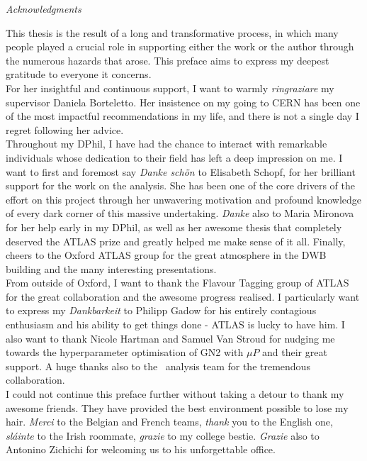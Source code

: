 \clearpage
{
\vspace{-1cm}
\begin{center}
\textit{\large \color{oxfordblue} Acknowledgments}
\end{center}}
This thesis is the result of a long and transformative process, in which many people played a crucial role in supporting either the work or the author through the numerous hazards that arose. This preface aims to express my deepest gratitude to everyone it concerns. \\

For her insightful and continuous support, I want to warmly \textit{ringraziare} my supervisor Daniela Borteletto. Her insistence on my going to CERN has been one of the most impactful recommendations in my life, and there is not a single day I regret following her advice.\\

Throughout my DPhil, I have had the chance to interact with remarkable individuals whose dedication to their field has left a deep impression on me. I want to first and foremost say \textit{Danke schön} to Elisabeth Schopf, for her brilliant support for the work on the analysis. She has been one of the core drivers of the effort on this project through her unwavering motivation and profound knowledge of every dark corner of this massive undertaking. \textit{Danke} also to Maria Mironova for her help early in my DPhil, as well as her awesome thesis that completely deserved the ATLAS prize and greatly helped me make sense of it all. Finally, cheers to the Oxford ATLAS group for the great atmosphere in the DWB building and the many interesting presentations. \\

From outside of Oxford, I want to thank the Flavour Tagging group of ATLAS for the great collaboration and the awesome progress realised. I particularly want to express my \textit{Dankbarkeit} to Philipp Gadow for his entirely contagious enthusiasm and his ability to get things done - ATLAS is lucky to have him. I also want to thank Nicole Hartman and Samuel Van Stroud for nudging me towards the hyperparameter optimisation of GN2 with $\mu$$P$ and their great support. A huge thanks also to the \vhbc\ analysis team for the tremendous collaboration. \\

I could not continue this preface further without taking a detour to thank my awesome friends. They have provided the best environment possible to lose my hair. \textit{Merci} to the Belgian and French teams, \textit{thank} you to the English one, \textit{sláinte} to the Irish roommate, \textit{grazie} to my college bestie. \textit{Grazie} also to Antonino Zichichi for welcoming us to his unforgettable office. 


